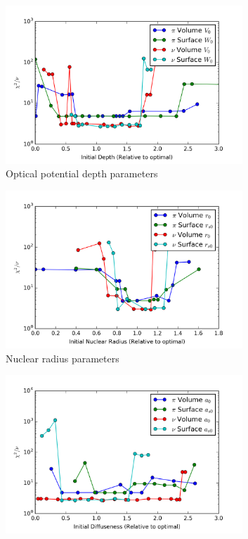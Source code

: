     \begin{figure}[h]
    \begin{subfigure}{0.5\textwidth}
    
		\centering
		\includegraphics[width=0.98\textwidth]{pnV.png}
		\caption{Optical potential depth parameters }
		\label{fig:pnV}
	\end{subfigure}
        \begin{subfigure}{0.5\textwidth}
		\centering
		\includegraphics[width=0.98\textwidth]{pnr.png}
		\caption{Nuclear radius parameters }
		\label{fig:pnr}
        \end{subfigure}
        \begin{subfigure}{0.5\textwidth}
		\centering
		\includegraphics[width=0.98\textwidth]{pna.png}

\end{subfigure}
\end{figure}
